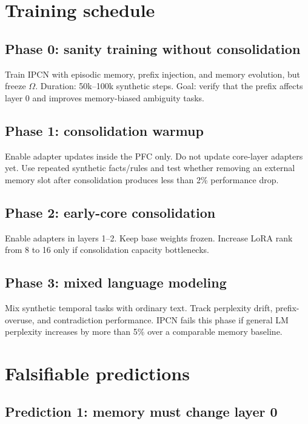 \documentclass[11pt]{article}
\begin{document}
\section{Training schedule}

\subsection{Phase 0: sanity training without consolidation}

Train IPCN with episodic memory, prefix injection, and memory evolution, but freeze \(\Omega\). Duration: 50k--100k synthetic steps. Goal: verify that the prefix affects layer 0 and improves memory-biased ambiguity tasks.

\subsection{Phase 1: consolidation warmup}

Enable adapter updates inside the PFC only. Do not update core-layer adapters yet. Use repeated synthetic facts/rules and test whether removing an external memory slot after consolidation produces less than 2\% performance drop.

\subsection{Phase 2: early-core consolidation}

Enable adapters in layers 1--2. Keep base weights frozen. Increase LoRA rank from 8 to 16 only if consolidation capacity bottlenecks.

\subsection{Phase 3: mixed language modeling}

Mix synthetic temporal tasks with ordinary text. Track perplexity drift, prefix-overuse, and contradiction performance. IPCN fails this phase if general LM perplexity increases by more than 5\% over a comparable memory baseline.

\section{Falsifiable predictions}

\subsection{Prediction 1: memory must change layer 0}
\end{document}
